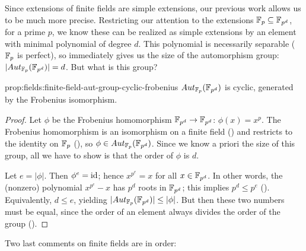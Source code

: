 Since extensions of finite fields are simple extensions, our previous
work allows us to be much more precise. Restricting our attention to
the extensions $\mathbb{F}_p \subseteq \mathbb{F}_{p^d}$, for a prime $p$, we know
these can be realized as simple extensions by an element with minimal
polynomial of degree $d$. This polynomial is necessarily separable
($\mathbb{F}_p$ is perfect), so  immediately gives us
the size of the automorphism group: $|Aut_{\mathbb{F}_p}(\mathbb{F}_{p^d})| = d$. But
what is this group?
\begin{prop}{}{prop:fields:finite-field-aut-group-cyclic-frobenius}
  $Aut_{\mathbb{F}_p}(\mathbb{F}_{p^d})$ is cyclic, generated by the Frobenius
  isomorphism.
\end{prop}
\begin{proof}
  Let $\phi$ be the Frobenius homomorphism $\mathbb{F}_{p^d} \to \mathbb{F}_{p^d}$:
  $\phi(x) = x^p$. The Frobenius homomorphism is an isomorphism on a
  finite field () and restricts to the identity
  on $\mathbb{F}_p$ (), so
  $\phi \in Aut_{\mathbb{F}_p}(\mathbb{F}_{p^d})$. Since we know a priori the size of
  this group, all we have to show is that the order of $\phi$ is $d$.

  Let $e = |\phi|$. Then $\phi^e = \operatorname{id}$; hence $x^{p^e} = x$ for all
  $x \in \mathbb{F}_{p^d}$. In other words, the (nonzero) polynomial
  $x^{p^e} - x$ has $p^d$ roots in $\mathbb{F}_{p^d}$; this implies
  $p^d \leq p^e$ (). Equivalently, $d \leq e$,
  yielding $|Aut_{\mathbb{F}_p}(\mathbb{F}_{p^d})| \leq |\phi|$. But then these two
  numbers must be equal, since the order of an element always divides
  the order of the group
  ().
\end{proof}
Two last comments on finite fields are in order:
